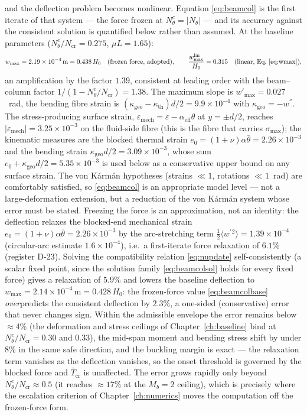 and the deflection problem becomes nonlinear. Equation \eqref{eq:beamcol} is the first iterate
of that system --- the force frozen at $N_\theta^c=|N_\theta|$ --- and its accuracy against the
consistent solution is quantified below rather than assumed. At the baseline parameters
($N_\theta^c/N_{\mathrm{cr}}=0.275$, $\mu L=1.65$):
\begin{equation}
w_{\max}=2.19\times10^{-4}\,\mathrm{m}=0.438\,H_0
\quad\text{(frozen force, adopted)},\qquad
\frac{w_{\max}^{\mathrm{lin}}}{H_0}=0.315
\quad\text{(linear, Eq.~\eqref{eq:wmax})},
\label{eq:beamcolbase}
\end{equation}
an amplification by the factor $1.39$, consistent at leading order with the beam--column
factor $1/(1-N_\theta^c/N_{\mathrm{cr}})=1.38$. The maximum slope is $w'_{\max}=0.027$~rad, the
bending fibre strain is $(\kappa_{\mathrm{geo}}-\kappa_{\mathrm{th}})d/2=9.9\times10^{-4}$ with
$\kappa_{\mathrm{geo}}=-w^{''}$. The stress-producing surface strain, $\varepsilon_{\mathrm{mech}}
=\varepsilon-\alpha_{\mathrm{eff}}\theta$ at $y=\pm d/2$, reaches $|\varepsilon_{\mathrm{mech}}|
=3.25\times10^{-3}$ on the fluid-side fibre (this is the fibre that carries $\sigma_{\max}$); the
kinematic measures are the blocked thermal strain $e_0=(1+\nu)\alpha\bar\theta=2.26\times10^{-3}$ and
the bending strain $\kappa_{\mathrm{geo}}d/2=3.09\times10^{-3}$, whose sum $e_0+\kappa_{\mathrm{geo}}
d/2=5.35\times10^{-3}$ is used below as a conservative upper bound on any surface strain. The
von K\'arm\'an hypotheses (strains $\ll1$, rotations $\ll1$~rad)
are comfortably satisfied, so \eqref{eq:beamcol} is an appropriate model level --- not a
large-deformation extension, but a reduction of the von K\'arm\'an system whose error must be
stated. Freezing the force is an approximation, not an identity: the deflection relaxes the
blocked-end mechanical strain $e_0=(1+\nu)\alpha\bar\theta=2.26\times10^{-3}$ by the
arc-stretching term $\tfrac12\langle w^{'}{}^2\rangle=1.39\times10^{-4}$ (circular-arc estimate
$1.6\times10^{-4}$), i.e.\ a first-iterate force relaxation of $6.1\%$ (register D-23). Solving the
compatibility relation \eqref{eq:nupdate} self-consistently (a scalar fixed point, since the
solution family \eqref{eq:beamcolsol} holds for every fixed force) gives a relaxation of
$5.9\%$ and lowers the baseline deflection to
$w_{\max}=2.14\times10^{-4}\,\mathrm{m}=0.428\,H_0$: the frozen-force value
\eqref{eq:beamcolbase} \emph{over}predicts the consistent deflection by $2.3\%$, a one-sided
(conservative) error that never changes sign. Within the admissible envelope the error remains
below $\approx4\%$ (the deformation and stress ceilings of Chapter~\ref{ch:baseline} bind at
$N_\theta^c/N_{\mathrm{cr}}=0.30$ and $0.33$), the mid-span moment and bending stress shift by
under $8\%$ in the same safe direction, and the buckling margin is exact --- the relaxation
term vanishes as the deflection vanishes, so the onset threshold is governed by the blocked
force and $\bar T_{\mathrm{cr}}$ is unaffected. The error grows rapidly only beyond
$N_\theta^c/N_{\mathrm{cr}}\approx0.5$ (it reaches $\approx17\%$ at the $M_b=2$ ceiling), which
is precisely where the escalation criterion of Chapter~\ref{ch:numerics} moves the computation
off the frozen-force form.

